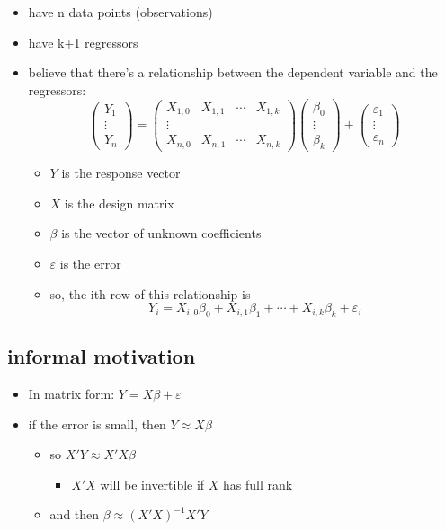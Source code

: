 \begin{itemize}
\item have n data points (observations)
\item have k+1 regressors
\item believe that there's a relationship between the dependent
        variable and the regressors:
        \[\begin{pmatrix} Y_1 \\ \vdots \\ Y_n\end{pmatrix}
        = \begin{pmatrix} 
        X_{1,0} & X_{1,1} & \cdots & X_{1,k} \\
        \vdots \\
        X_{n,0} & X_{n,1} & \cdots & X_{n,k} \end{pmatrix}
        \begin{pmatrix}  \beta_0 \\ \vdots \\ \beta_k \end{pmatrix}+ 
        \begin{pmatrix} \varepsilon_1 \\ \vdots \\
          \varepsilon_n \end{pmatrix} \]
\begin{itemize}
\item $Y$ is the response vector
\item $X$ is the design matrix
\item $\beta$ is the vector of unknown coefficients
\item $\varepsilon$ is the error
\item so, the ith row of this relationship is
            \[Y_i = X_{i,0} \beta_0 + X_{i,1} \beta_1 + \cdots + X_{i,k}
            \beta_k + \varepsilon_i\]
\end{itemize}
\end{itemize}
\subsection{informal motivation}
\label{sec-1-2}

\begin{itemize}
\item In matrix form: $Y = X \beta + \varepsilon$
\item if the error is small, then $Y \approx X\beta$
\begin{itemize}
\item so $X'Y \approx X'X \beta$
\begin{itemize}
\item $X'X$ will be invertible if $X$ has full rank
\end{itemize}
\item and then $\beta \approx (X'X)^{-1} X'Y$
\end{itemize}
\end{itemize}
